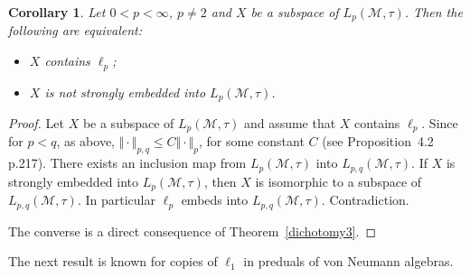 \documentclass[12pt]{amsart}
\let\cal\mathcal
\newtheorem{corollary}[theorem]{Corollary}
\def\m{{\cal M}}
\numberwithin{equation}{section}
\numberwithin{theorem}{section}
\begin{document}
\begin{corollary}\label{Rosenthal}
Let $0<p<\infty$, $p\neq 2$ and $X$ be a subspace of $L_p(\m,\tau)$. Then the 
following are equivalent:
\begin{itemize}
\item[(1)] $X$ contains $\ell_p$;
\item[(2)] $X$ is not strongly embedded into $L_p(\m,\tau)$.
\end{itemize}
\end{corollary}

\begin{proof}
Let $X$ be a subspace of $L_p(\m,\tau)$ and assume that $X$ contains
$\ell_p$. Since for $p<q$, as above,
$\Vert \cdot \Vert_{p,q} \leq C\Vert \cdot \Vert_p$, for some constant $C$
(see  
\cite{BENSHA} Proposition~4.2  p.217). There exists an inclusion map
from $L_p(\m,\tau)$ into $L_{p,q}(\m,\tau)$. If $X$ is strongly embedded
into $L_p(\m,\tau)$, then $X$ is isomorphic to a subspace of 
$L_{p,q}(\m,\tau)$.
In particular $\ell_p$ embeds into $L_{p,q}(\m,\tau)$. Contradiction.

The converse is a direct consequence of Theorem~\ref{dichotomy3}.
\end{proof}

The next result is known for copies of $\ell_1$ in preduals
of von Neumann algebras.
\end{document}
